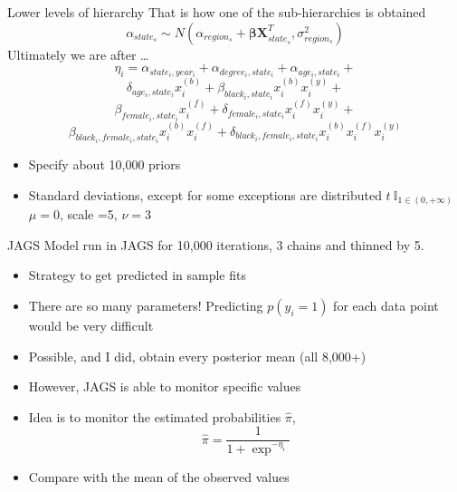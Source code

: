 \documentclass{beamer}
\begin{document}
	\begin{frame}{Lower levels of hierarchy}
		That is how one of the sub-hierarchies is obtained
			\[
			\alpha_{state_s} \sim N(\alpha_{region_s} + \bm{\beta X}^{T}_{state_s}, \sigma^2_{region_s}   )
			\]
			Ultimately we are after \dots
						 $$ \eta_i = \alpha_{state_i, year_i} + \alpha_{degree_i, state_i} + \alpha_{age_i, state_i} +  $$
						 $$ \delta_{age_i, state_i}x^{(b)}_i + \beta_{black_i, state_i}x^{(b)}_ix^{(y)}_i  + $$
						 $$ \beta_{female_i, state_i} x^{(f)}_i +  \delta_{female_i, state_i}x^{(f)}_ix^{(y)}_i  + $$ 
						 $$ \beta_{black_i, female_i, state_i}x^{(b)}_ix^{(f)}_i + \delta_{black_i, female_i, state_i}x^{(b)}_ix^{(f)}_ix^{(y)}_i $$
		\begin{itemize}
			\item Specify about 10,000 priors 
			\item Standard deviations, except for some exceptions are distributed $ t  \ \mathbb{I}_{1\in(0,+\infty)} $ $ \mu=0 $, scale =5, $ \nu =3 $ 
		\end{itemize}
		\end{frame}
	\begin{frame}{JAGS}
		Model run in JAGS for 10,000 iterations, 3 chains and thinned by 5. 
		\begin{itemize}
			\item Strategy to get predicted in sample fits
			\item There are so many parameters! Predicting $ p(y_i =1) $ for each data point would be very difficult
			\item Possible, and I did, obtain every posterior mean (all 8,000+)
			\item However, JAGS is able to monitor specific values
			\item Idea is to monitor the estimated probabilities $ \hat{\pi} $, 
			\[
			\hat{\pi} = \frac{1}{1 + \exp^{-\eta_i} }
			\]
			\item Compare with the mean of the observed values
		\end{itemize}
	\end{frame}
	
\end{document}
